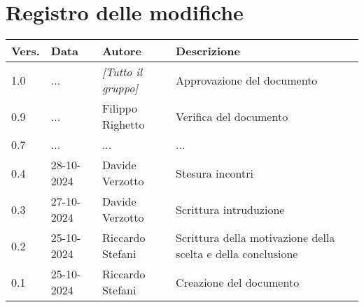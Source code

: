 \section*{Registro delle modifiche}

\begin{table}[h]
    \centering
    \begin{tabular}{|l|l|l|p{5cm}|}
        \hline
        \rowcolor[gray]{0.9}
        \textbf{Vers.} & \textbf{Data} & \textbf{Autore} & \textbf{Descrizione}\\
        \hline
        1.0 & ... & \emph{[Tutto il gruppo]} & Approvazione del documento\\
        \hline
        0.9 & ... & Filippo Righetto & Verifica del documento\\
        \hline
        0.7 & ... & ... & ...\\
        \hline
        0.4 & 28-10-2024 & Davide Verzotto & Stesura incontri\\
        \hline
        0.3 & 27-10-2024 & Davide Verzotto & Scrittura intruduzione\\
        \hline
        0.2 & 25-10-2024 & Riccardo Stefani & Scrittura della motivazione della scelta e della conclusione\\
        \hline
        0.1 & 25-10-2024 & Riccardo Stefani & Creazione del documento\\
        \hline
    \end{tabular}
\end{table}
